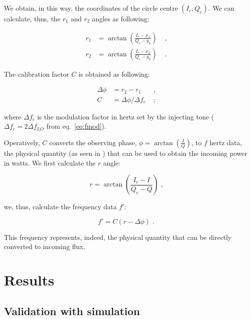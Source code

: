 \documentclass[twocolumn,traditabstract]{aa}\\
\begin{document}
We obtain, in this way, the coordinates of the circle centre $(I_c,Q_c)$. We can calculate, thus, the $r_1$ and $r_2$ angles as following:

\begin{equation}
\begin{align}
r_1 &= \arctan\left( \frac{I_c-x_1}{Q_c - y_1}  \right) &\text{ ,}\\
r_2 &= \arctan\left( \frac{I_c-x_2}{Q_c - y_2}  \right) &\text{ .}
\end{align}
\end{equation}

\noindent The calibration factor $C$ is obtained as following:

\begin{equation}
\begin{align}
\Delta \phi &= r_2-r_1 &\text{ ,}\\
C&=\Delta\phi/\Delta f_c &\text{ ;}
\end{align}
\end{equation}

\noindent where $\Delta f_c$ is the modulation factor in hertz set by the injecting tone ($\Delta f_c = 2\Delta f_{LO}$ from eq.~\ref{eq:fmod}).

Operatively, $C$ converts the observing phase, $\phi=\arctan\left( \frac{I}{Q} \right)$, to $f$ hertz data, the physical quantity (as seen in \cite{Swenson}) that can be used to obtain the incoming power in watts. We first calculate the $r$ angle:


\begin{equation}
r = \arctan \left( \frac{I_c - I}{Q_c - Q} \right)  \text{ ,}
\end{equation}

\noindent we, thus, calculate the frequency data $f'$:

\begin{equation}
f' = C (r-\Delta\phi) \text{ .}
\end{equation}

\noindent This frequency represents, indeed, the physical quantity that can be directly converted to incoming flux.


\section{Results}
\label{sec:results}

\subsection{Validation with simulation}
\end{document}
